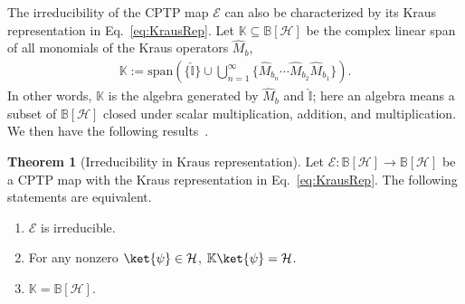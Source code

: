 \documentclass[preprint,pteplogo]{ptephy_v2}%
\numberwithin{equation}{section}
\theoremstyle{definition}
\newtheorem{theorem}{Theorem}
\newcommand{\mc}[1]{\mathcal{#1}}
\newcommand{\mbb}[1]{\mathbb{#1}}
\begin{document}
The irreducibility of the CPTP map $\mc{E}$ can also be characterized by its Kraus representation in Eq.~\eqref{eq:KrausRep}. 
Let $\mbb{K} \subseteq \mbb{B}[\mc{H}]$ be the complex linear span of all monomials of the Kraus operators $\hat{M}_b$,
\begin{align}
\mbb{K} := \textrm{span} \left( \{ \hat{\mbb{I}} \} \cup \bigcup_{n=1}^\infty \{ \hat{M}_{b_n} \cdots \hat{M}_{b_2} \hat{M}_{b_1} \} \right).
\end{align}
In other words, $\mbb{K}$ is the algebra generated by $\hat{M}_b$ and $\hat{\mbb{I}}$; here an algebra means a subset of $\mbb{B}[\mc{H}]$ closed under scalar multiplication, addition, and multiplication. 
We then have the following results~\cite{farenick1996irreducible, schrader2000perron, jaksic2014entropic, carbone2016open}.
\begin{theorem}[Irreducibility in Kraus representation] \label{thm:IrreducibilityByKraus}
Let $\mc{E}: \mbb{B}[\mc{H}] \to \mbb{B}[\mc{H}]$ be a CPTP map with the Kraus representation in Eq.~\eqref{eq:KrausRep}. 
The following statements are equivalent.
\begin{enumerate}
\item $\mc{E}$ is irreducible.
\item For any nonzero $\ket{\psi} \in \mc{H}$, $\mbb{K} \ket{\psi} = \mc{H}$.
\item $\mbb{K} = \mbb{B}[\mc{H}]$.
\end{enumerate}
\end{theorem}
\end{document}
